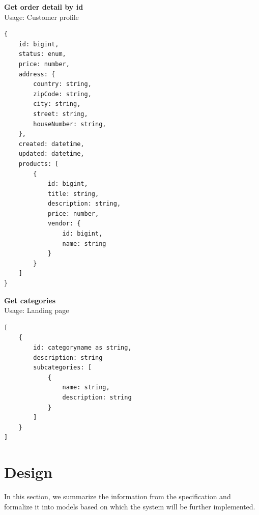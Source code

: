 \documentclass[12pt,english]{article}
\begin{document}
\noindent\textbf{Get order detail by id}\\
Usage: Customer profile
\begin{lstlisting}[style=jsonstyle]
{
    id: bigint,
    status: enum,
    price: number,
    address: {
        country: string,
        zipCode: string,
        city: string,
        street: string,
        houseNumber: string,
    },
    created: datetime,
    updated: datetime,
    products: [
        {
            id: bigint,
            title: string,
            description: string,
            price: number,
            vendor: {
                id: bigint,
                name: string
            }
        }
    ]  
}
\end{lstlisting}

\noindent\textbf{Get categories}\\
Usage: Landing page
\begin{lstlisting}[style=jsonstyle]
[
    {
        id: categoryname as string,
        description: string
        subcategories: [
            {
                name: string,
                description: string
            }
        ]
    }
]
\end{lstlisting}

\newpage

\section{Design}
In this section, we summarize the information from the specification and formalize it into models based on which the system will be further implemented. 
\end{document}
